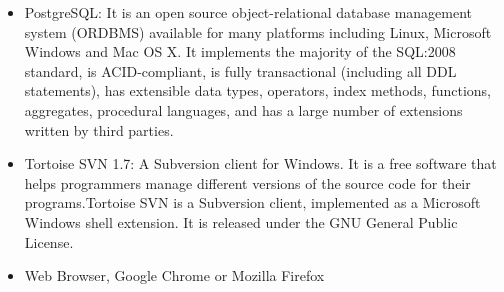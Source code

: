 \documentclass[12pt]{article}
\begin{document}
\begin{itemize}
\item PostgreSQL:
It is an open source object-relational database management system (ORDBMS) available for many platforms including Linux, Microsoft Windows and Mac OS X. 
It implements the majority of the SQL:2008 standard, is ACID-compliant, is fully transactional (including all DDL statements), has extensible data types, operators, index methods, functions, aggregates, procedural languages, and has a large number of extensions written by third parties.

\item Tortoise SVN 1.7: A Subversion client for Windows.
It is a free software that helps programmers manage different versions of the source code for their programs.Tortoise SVN is a Subversion client, implemented as a Microsoft Windows shell extension. It is released under the GNU General Public License.

\item Web Browser, Google Chrome or Mozilla Firefox
\end{itemize}
\end{document}
